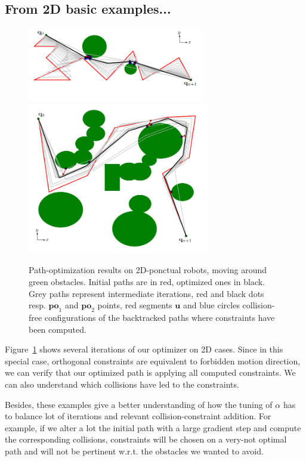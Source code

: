 \documentclass{tADR2e}
\newcommand\po{\mathbf{po}}
\begin{document}
\subsection{From 2D basic examples...}

\begin{figure}[t]
	\centering
	\includegraphics[width=7.8cm]{contact_points6.png}
	\includegraphics[width=8cm]{contact_points2potential.png}
	\caption{Path-optimization results on 2D-ponctual robots, moving around 
	green obstacles. Initial paths are in red, optimized ones in black. Grey paths 
	represent intermediate iterations, red and black dots resp. $\po_1$ and $\po_2$ 
	points, red segments $\mathbf{u}$ and blue circles collision-free 
	configurations 
	of the backtracked paths 
	where constraints have been computed.}
	\label{2D_long}
\end{figure}

Figure~\ref{2D_long} shows several iterations of our optimizer on 2D cases. Since 
in this special case, orthogonal constraints are equivalent to forbidden motion 
direction, we can verify that our optimized path is applying 
all computed constraints. We can also understand which collisions have led to 
the constraints.

Besides, these examples give a better understanding of how the tuning of $\alpha$ 
has to balance lot of iterations and relevant collision-constraint addition. For 
example, if we alter a lot the initial path with a large gradient step and 
compute the corresponding collisions, constraints will be chosen on a very-not 
optimal path and will not be pertinent w.r.t. the obstacles we wanted to 
avoid.
\end{document}
